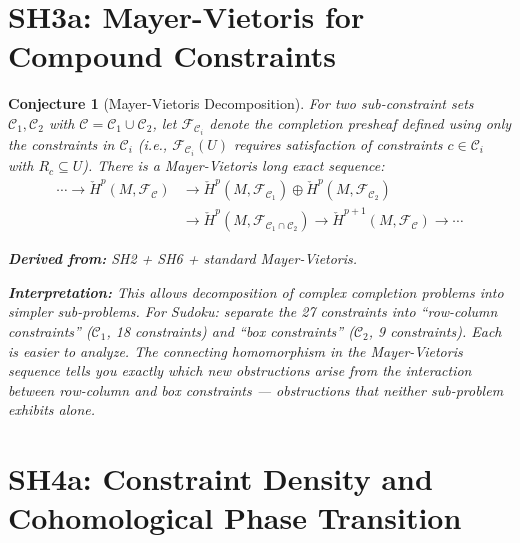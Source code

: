 \documentclass[11pt,letterpaper]{article}
\newtheorem{conjecture}{Conjecture}[section]
\newcommand{\Hcech}{\check{H}}
\newcommand{\sheaf}{\mathcal{F}}
\newcommand{\constraint}{\mathcal{C}}
\begin{document}
\section{SH3a: Mayer-Vietoris for Compound Constraints}

\begin{conjecture}[Mayer-Vietoris 
Decomposition]\label{conj:mayer_vietoris}
For two sub-constraint sets $\constraint_1, \constraint_2$ with 
$\constraint = \constraint_1 \cup \constraint_2$, let 
$\sheaf_{\constraint_i}$ denote the completion presheaf defined using 
only the constraints in $\constraint_i$ (i.e., $\sheaf_{\constraint_i}
(U)$ requires satisfaction of constraints $c \in \constraint_i$ with 
$R_c \subseteq U$). There is a Mayer-Vietoris long exact sequence:
\begin{equation}\label{eq:mv}
\begin{split}
    \cdots \to \Hcech^p(M, \sheaf_{\constraint}) &\to 
    \Hcech^p(M, \sheaf_{\constraint_1}) \oplus 
    \Hcech^p(M, \sheaf_{\constraint_2}) \\
    &\to \Hcech^p(M, \sheaf_{\constraint_1 \cap \constraint_2}) 
    \to \Hcech^{p+1}(M, \sheaf_{\constraint}) \to \cdots
\end{split}
\end{equation}

\textbf{Derived from:} SH2 + SH6 + standard Mayer-Vietoris.

\textbf{Interpretation:} This allows decomposition of complex 
completion problems into simpler sub-problems. For Sudoku: separate 
the 27 constraints into ``row-column constraints'' ($\constraint_1$, 
18 constraints) and ``box constraints'' ($\constraint_2$, 9 
constraints). Each is easier to analyze. The connecting homomorphism 
in the Mayer-Vietoris sequence tells you exactly which new 
obstructions arise from the \emph{interaction} between row-column and 
box constraints --- obstructions that neither sub-problem exhibits 
alone.
\end{conjecture}

\section{SH4a: Constraint Density and Cohomological Phase Transition}
\end{document}
